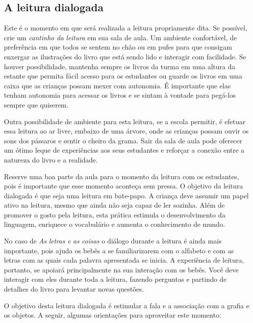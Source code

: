 \documentclass[11pt]{extarticle}
\begin{document}
\subsection{A leitura dialogada}
Este é o momento em que será realizada a leitura propriamente dita. 
Se possível, crie um \textit{cantinho da leitura} em sua sala de aula. Um 
ambiente confortável, de preferência em que todos se sentem no chão ou 
em pufes para que consigam enxergar as ilustrações do livro que está 
sendo lido e interagir com facilidade. Se houver possibilidade, mantenha 
sempre os livros da turma em uma altura da estante que permita fácil 
acesso para os estudantes ou guarde os livros em uma caixa que as crianças 
possam mexer com autonomia. É importante que elas tenham autonomia para 
acessar os livros e se sintam à vontade para pegá-los sempre que quiserem. 


Outra possibilidade de ambiente para esta leitura, se a escola permitir, 
é efetuar essa leitura ao ar livre, embaixo de uma árvore, onde as crianças 
possam ouvir os sons dos pássaros e sentir o cheiro da grama. Sair da sala 
de aula pode oferecer um ótimo leque de experiências aos seus estudantes e 
reforçar a conexão entre a natureza do livro e a realidade.  

Reserve uma boa parte da aula para o momento da leitura com os estudantes, 
pois é importante que esse momento aconteça sem pressa. O objetivo da 
leitura dialogada é que seja uma leitura em bate-papo. A criança deve 
assumir um papel ativo na leitura, mesmo que ainda não seja capaz de 
ler sozinha. Além de promover o gosto pela leitura, esta prática estimula 
o desenvolvimento da linguagem, enriquece o vocabulário e 
aumenta o conhecimento de mundo.

No caso de \textit{As letras e as coisas} o diálogo durante a leitura é 
ainda mais importante, pois ajuda os bebês a se familiarizarem com o alfabeto e com as letras com as quais cada palavra apresentada se inicia.
A experiência de leitura, portanto, se apoiará principalmente na sua interação com os bebês. 
Você deve interagir com eles durante toda a 
leitura, fazendo perguntas e partindo de detalhes do livro para 
levantar novas questões. 

O objetivo desta leitura dialogada é estimular a fala e a associação com a grafia e os objetos.
A seguir, algumas orientações para aproveitar este momento: 
\end{document}

